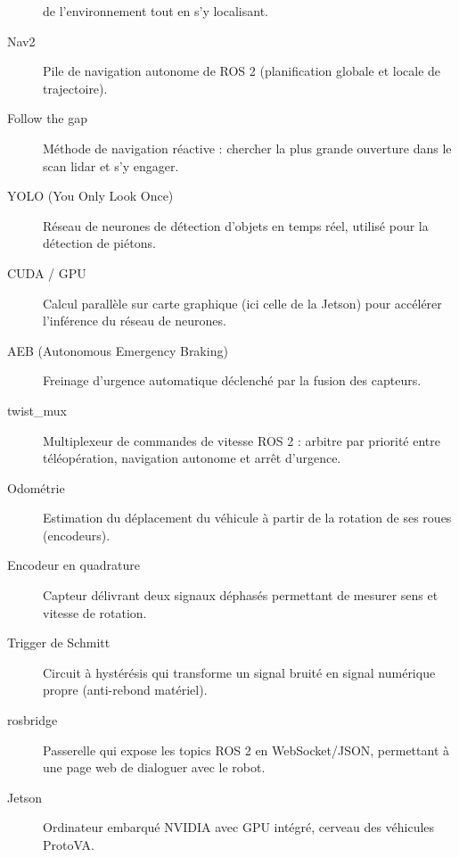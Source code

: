 \begin{description}
  de l'environnement tout en s'y localisant.
  \item[Nav2] Pile de navigation autonome de ROS 2 (planification globale et
  locale de trajectoire).
  \item[Follow the gap] Méthode de navigation réactive : chercher la plus
  grande ouverture dans le scan lidar et s'y engager.
  \item[YOLO (You Only Look Once)] Réseau de neurones de détection d'objets en
  temps réel, utilisé pour la détection de piétons.
  \item[CUDA / GPU] Calcul parallèle sur carte graphique (ici celle de la
  Jetson) pour accélérer l'inférence du réseau de neurones.
  \item[AEB (Autonomous Emergency Braking)] Freinage d'urgence automatique
  déclenché par la fusion des capteurs.
  \item[twist\_mux] Multiplexeur de commandes de vitesse ROS 2 : arbitre par
  priorité entre téléopération, navigation autonome et arrêt d'urgence.
  \item[Odométrie] Estimation du déplacement du véhicule à partir de la
  rotation de ses roues (encodeurs).
  \item[Encodeur en quadrature] Capteur délivrant deux signaux déphasés
  permettant de mesurer sens et vitesse de rotation.
  \item[Trigger de Schmitt] Circuit à hystérésis qui transforme un signal
  bruité en signal numérique propre (anti-rebond matériel).
  \item[rosbridge] Passerelle qui expose les topics ROS 2 en WebSocket/JSON,
  permettant à une page web de dialoguer avec le robot.
  \item[Jetson] Ordinateur embarqué NVIDIA avec GPU intégré, cerveau des
  véhicules ProtoVA.
\end{description}
